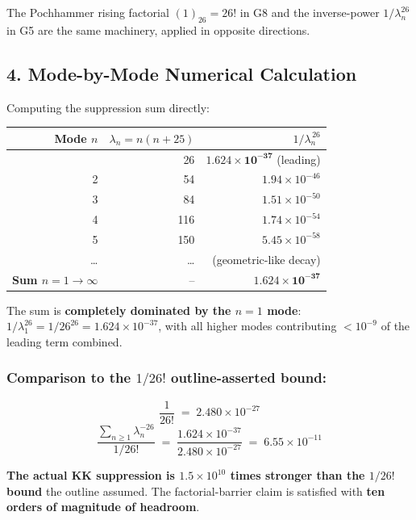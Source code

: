 \documentclass[
]{article}
\newcounter{none} %
\begin{document}
The Pochhammer rising factorial \((1)_{26}=26!\) in G8 and the
inverse-power \(1/\lambda_n^{26}\) in G5 are the same machinery, applied
in opposite directions.

\subsection{4. Mode-by-Mode Numerical
Calculation}\label{mode-by-mode-numerical-calculation}

Computing the suppression sum directly:

{\def\LTcaptype{none} %
\begin{longtable}[]{@{}rrr@{}}
\toprule\noalign{}
Mode \(n\) & \(\lambda_n = n(n+25)\) & \(1/\lambda_n^{\,26}\) \\
\midrule\noalign{}
\endhead
\bottomrule\noalign{}
\endlastfoot
1 & 26 & \(\mathbf{1.624\times 10^{-37}}\) (leading) \\
2 & 54 & \(1.94\times 10^{-46}\) \\
3 & 84 & \(1.51\times 10^{-50}\) \\
4 & 116 & \(1.74\times 10^{-54}\) \\
5 & 150 & \(5.45\times 10^{-58}\) \\
\ldots{} & \ldots{} & (geometric-like decay) \\
\textbf{Sum \(n=1\to\infty\)} & -- &
\(\mathbf{1.624\times 10^{-37}}\) \\
\end{longtable}
}

The sum is \textbf{completely dominated by the \(n=1\) mode}:
\(1/\lambda_1^{26} = 1/26^{26}
= 1.624\times 10^{-37}\), with all higher modes contributing
\(< 10^{-9}\) of the leading term combined.

\subsubsection{\texorpdfstring{Comparison to the \(1/26!\)
outline-asserted
bound:}{Comparison to the 1/26! outline-asserted bound:}}\label{comparison-to-the-126-outline-asserted-bound}

\[\frac{1}{26!} \;=\; 2.480\times 10^{-27}\]
\[\frac{\sum_{n\geq 1}\lambda_n^{-26}}{1/26!} \;=\; \frac{1.624\times 10^{-37}}{2.480\times 10^{-27}} \;=\; 6.55\times 10^{-11}\]

\textbf{The actual KK suppression is \(1.5\times 10^{10}\) times
stronger than the \(1/26!\) bound} the outline assumed. The
factorial-barrier claim is satisfied with \textbf{ten orders of
magnitude of headroom}.
\end{document}
